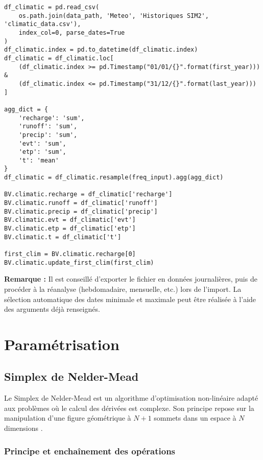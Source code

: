 \begin{verbatim}
df_climatic = pd.read_csv(
    os.path.join(data_path, 'Meteo', 'Historiques SIM2', 'climatic_data.csv'),
    index_col=0, parse_dates=True
)
df_climatic.index = pd.to_datetime(df_climatic.index)
df_climatic = df_climatic.loc[
    (df_climatic.index >= pd.Timestamp("01/01/{}".format(first_year))) &
    (df_climatic.index <= pd.Timestamp("31/12/{}".format(last_year)))
]

agg_dict = {
    'recharge': 'sum',
    'runoff': 'sum',
    'precip': 'sum',
    'evt': 'sum',
    'etp': 'sum',
    't': 'mean'
}
df_climatic = df_climatic.resample(freq_input).agg(agg_dict)

BV.climatic.recharge = df_climatic['recharge']
BV.climatic.runoff = df_climatic['runoff']
BV.climatic.precip = df_climatic['precip']
BV.climatic.evt = df_climatic['evt']
BV.climatic.etp = df_climatic['etp']
BV.climatic.t = df_climatic['t']

first_clim = BV.climatic.recharge[0]
BV.climatic.update_first_clim(first_clim)
\end{verbatim}

\begin{TipBox}
    \textbf{Remarque :} Il est conseillé d’exporter le fichier en données journalières, puis de procéder à la réanalyse (hebdomadaire, mensuelle, etc.) lors de l’import. La sélection automatique des dates minimale et maximale peut être réalisée à l’aide des arguments déjà renseignés.
\end{TipBox}

\section{Paramétrisation}
\label{sec:parametrisation}

\subsection{Simplex de Nelder-Mead}
\label{sec:simplex}

Le Simplex de Nelder-Mead est un algorithme d'optimisation non-linéaire adapté aux problèmes où le calcul des dérivées est complexe. Son principe repose sur la manipulation d'une figure géométrique à \(N+1\) sommets dans un espace à \(N\) dimensions \parencite{nelderSimplexMethodFunction1965,lagariasConvergencePropertiesNelderMead1998}.

\vspace{1em}

\subsubsection{Principe et enchaînement des opérations}

